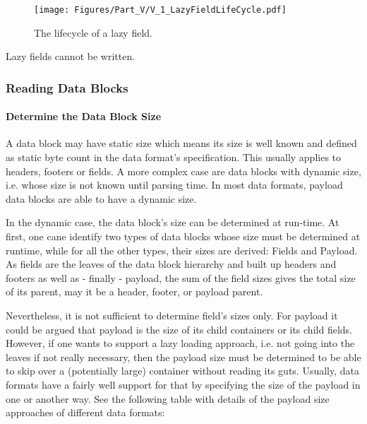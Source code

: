 \begin{figure}[H]
	\centering
	\texttt{[image: Figures/Part\_V/V\_1\_LazyFieldLifeCycle.pdf]}
	\caption{The lifecycle of a lazy field.}
	\label{fig:V_1_LazyFieldLifeCycle}
\end{figure}

Lazy fields cannot be written.


\subsubsection{Reading Data Blocks}
\label{sec:ReadingDataBlocks}


\paragraph{Determine the Data Block Size}
\label{sec:DetermineDataBlockSize}

A data block may have static size which means its size is well known and defined as static byte count in the data format's specification. This usually applies to headers, footers or fields. A more complex case are data blocks with dynamic size, i.e. whose size is not known until parsing time. In most data formats, payload data blocks are able to have a dynamic size.

In the dynamic case, the data block's size can be determined at run-time. At first, one cane identify two types of data blocks whose size must be determined at runtime, while for all the other types, their sizes are derived: Fields and Payload. As fields are the leaves of the data block hierarchy and built up headers and footers as well as - finally - payload, the sum of the field sizes gives the total size of its parent, may it be a header, footer, or payload parent. 

Nevertheless, it is not sufficient to determine field's sizes only. For payload it could be argued that payload is the size of its child containers or its child fields. However, if one wants to support a lazy loading approach, i.e. not going into the leaves if not really necessary, then the payload size must be determined to be able to skip over a (potentially large) container without reading its guts. Usually, data formats have a fairly well support for that by specifying the size of the payload in one or another way. See the following table with details of the payload size approaches of different data formats:

